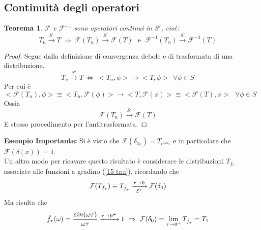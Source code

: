 \documentclass[twoside]{article}
\newtheorem{theorem}{Teorema}[section]
\begin{document}
\subsection{Continuità degli operatori}
\begin{theorem}
$\mathcal{F}$ e $\mathcal{F}^{-1}$ sono operatori continui in $S'$, cioè:
\begin{equation}
    T_n \xrightarrow{S'}T \ \Rightarrow \ \mathcal{F}(T_n) \xrightarrow{S'}\mathcal{F}(T) \ \ \ \text{e} \ \ \ \mathcal{F}^{-1}(T_n) \xrightarrow{S'}\mathcal{F}^{-1}(T)
\end{equation}
\end{theorem}

\begin{proof}
Segue dalla definizione di convergenza debole e di trasformata di una distribuzione.
\begin{equation}
    T_n \xrightarrow{S'}T \ \iff \ <T_n,\phi> \to <T,\phi> \ \ \forall \phi \in S
\end{equation}
Per cui è 
\begin{equation}
   <\mathcal{F}(T_n),\phi>\equiv <T_n,\mathcal{F}(\phi)> \to <T,\mathcal{F}(\phi)>\equiv <\mathcal{F}(T),\phi> \ \ \ \forall \phi \in S
\end{equation}
Ossia
\begin{equation}
    \mathcal{F}(T_n) \xrightarrow{S'}\mathcal{F}(T)
\end{equation}
E stesso procedimento per l'antitrasformata.

\end{proof}

\textbf{Esempio Importante:}
Si è visto che $\mathcal{F}(\delta_{x_0})=T_{e^{i\omega x_0}}$ e in particolare che $\mathcal{F}(\delta(x))=1$.
\\
Un altro modo per ricavare questo risultato è considerare le distribuzioni $T_{f_{\tau}}$ associate alle funzioni a gradino (\ref{15 tau}), ricordando che 
\begin{equation}
    \mathcal{F}(T_{f_{\tau}})\equiv T_{\Tilde{f}_{\tau}} \xrightarrow[\mathcal{E}']{\tau \to 0}\mathcal{F}(\delta_0)
\end{equation}
Ma risulta che
\begin{equation}
    \Tilde{f}_{\tau}(\omega)=\frac{sin(\omega \tau)}{\omega \tau} \xrightarrow{\tau \to 0^+} 1 \ \Rightarrow \ \mathcal{F}(\delta_0)=\lim_{\tau \to 0^+}T_{\Tilde{f}_{\tau}}=T_1
\end{equation}
\end{document}
